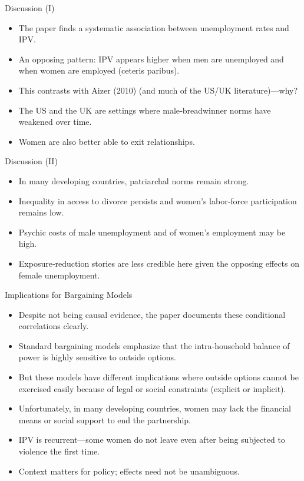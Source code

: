 \documentclass[11pt,notes=hide,aspectratio=169,mathserif]{beamer}
\begin{document}
\begin{frame}{Discussion (I)}
\begin{itemize}
  \item The paper finds a systematic association between unemployment rates and IPV.
  \item An opposing pattern: IPV appears higher when men are unemployed and when women are employed (ceteris paribus).
  \item This contrasts with Aizer (2010) (and much of the US/UK literature)—why?
  \pause \item The US and the UK are settings where male‑breadwinner norms have weakened over time.
  \item Women are also better able to exit relationships.
\end{itemize}
\end{frame}

\begin{frame}{Discussion (II)}
\begin{itemize}
  \item In many developing countries, patriarchal norms remain strong.
  \item Inequality in access to divorce persists and women’s labor‑force participation remains low.
  \item Psychic costs of male unemployment and of women’s employment may be high.
  \item Exposure‑reduction stories are less credible here given the opposing effects on female unemployment.
\end{itemize}
\end{frame}

\begin{frame}{Implications for Bargaining Models}
\begin{itemize}
  \item Despite not being causal evidence, the paper documents these conditional correlations clearly.
  \item Standard bargaining models emphasize that the intra‑household balance of power is highly sensitive to outside options.
  \item But these models have different implications where outside options cannot be exercised easily because of legal or social constraints (explicit or implicit).
  \item Unfortunately, in many developing countries, women may lack the financial means or social support to end the partnership.
  \item IPV is recurrent—some women do not leave even after being subjected to violence the first time.
  \item Context matters for policy; effects need not be unambiguous.
\end{itemize}
\end{frame}
\end{document}

